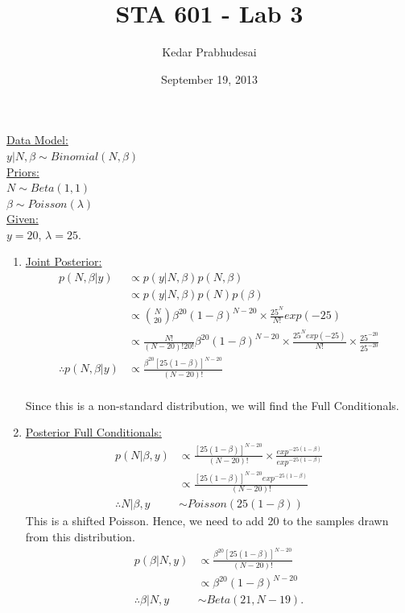 \documentclass{article}
\title{STA 601 - Lab 3}
\author{Kedar Prabhudesai}
\date{September 19, 2013}
\begin{document}
\maketitle
\noindent \underline{Data Model:} \\
\indent $y|N,\beta \sim Binomial(N,\beta)$\\
\noindent \underline{Priors:} \\
\indent $N \sim Beta(1,1)$\\
\indent $\beta \sim Poisson(\lambda)$\\
\noindent \underline{Given:}\\
\indent $y=20$, $\lambda=25.$\\

\begin{enumerate}
\item \underline{Joint Posterior:}
\begin{align*}
p(N,\beta|y) &\propto p(y|N,\beta)p(N,\beta)\\
&\propto p(y|N,\beta)p(N)p(\beta)\\
&\propto \binom{N}{20}\beta^{20}(1-\beta)^{N-20} \times \frac{25^{N}}{N!}exp(-25)\\
&\propto \frac{N!}{(N-20)!20!} \beta^{20}(1-\beta)^{N-20} \times \frac{25^{N}exp(-25)}{N!} \times \frac{25^{-20}}{25^{-20}}\\
\therefore p(N,\beta|y) &\propto \frac{\beta^{20}[25(1-\beta)]^{N-20}}{(N-20)!}\\
\end{align*}

\noindent Since this is a non-standard distribution, we will find the Full Conditionals.

\item \underline{Posterior Full Conditionals:}
\begin{align*}
p(N|\beta,y) &\propto \frac{[25(1-\beta)]^{N-20}}{(N-20)!} \times \frac{exp^{-25(1-\beta)}}{exp^{-25(1-\beta)}}\\
&\propto \frac{[25(1-\beta)]^{N-20}exp^{-25(1-\beta)}}{(N-20)!}\\
\therefore N|\beta,y &\sim Poisson(25(1-\beta))
\end{align*}
This is a shifted Poisson. Hence, we need to add 20 to the samples drawn from this distribution.\\
\begin{align*}
p(\beta|N,y) &\propto \frac{\beta^{20}[25(1-\beta)]^{N-20}}{(N-20)!}\\
&\propto \beta^{20}(1-\beta)^{N-20}\\
\therefore \beta|N,y &\sim Beta(21,N-19).
\end{align*}


\end{enumerate}
\end{document}

